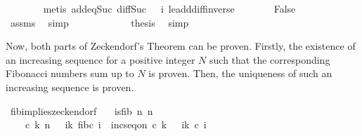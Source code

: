 \begin{isabellebody}
\ \ \ \ \ \ \isamarkupfalse%
\ {\isacharparenleft}{\kern0pt}metis\ add{\isacharunderscore}{\kern0pt}{}{\isacharunderscore}{\kern0pt}eq{\isacharunderscore}{\kern0pt}Suc\ diff{\isacharunderscore}{\kern0pt}Suc{\isacharunderscore}{\kern0pt}{}\ {\isacartoucheopen}{}\ {\isasymle}\ i{\isacartoucheclose}\ le{\isacharunderscore}{\kern0pt}add{\isacharunderscore}{\kern0pt}diff{\isacharunderscore}{\kern0pt}inverse{\isacharparenright}{\kern0pt}\isanewline
\ \ \ \ \isamarkupfalse%
\ \isamarkupfalse%
\ False\isanewline
\ \ \ \ \ \ \isamarkupfalse%
\ assms\ \isamarkupfalse%
\ simp\isanewline
\ \ \ \ \isamarkupfalse%
\isanewline
\ \ \ \ \isamarkupfalse%
\ \isamarkupfalse%
\ {\isacharquery}{\kern0pt}thesis\ \isamarkupfalse%
\ simp\isanewline
\ \ \isamarkupfalse%
%
\endisatagproof
{\isafoldproof}%
%
\isadelimproof
%
\endisadelimproof
%
\isadelimdocument
%
\endisadelimdocument
%
\isatagdocument
%
\isamarkuptrue%
%
\endisatagdocument
{\isafolddocument}%
%
\isadelimdocument
%
\endisadelimdocument
%
\begin{isamarkuptext}%
Now, both parts of Zeckendorf's Theorem can be proven. Firstly, the existence of an increasing 
  sequence for a positive integer $N$ such that the corresponding Fibonacci numbers sum up to $N$ 
  is proven. Then, the uniqueness of such an increasing sequence is proven.%
\end{isamarkuptext}\isamarkuptrue%
\isamarkupfalse%
\ fib{\isacharunderscore}{\kern0pt}implies{\isacharunderscore}{\kern0pt}zeckendorf{\isacharcolon}{\kern0pt}\isanewline
\ \ \ {\isachardoublequoteopen}is{\isacharunderscore}{\kern0pt}fib\ n{\isachardoublequoteclose}\ {\isachardoublequoteopen}n\ {\isachargreater}{\kern0pt}\ {}{\isachardoublequoteclose}\isanewline
\ \ \ {\isachardoublequoteopen}{\isasymexists}\ c\ k{\isachardot}{\kern0pt}\ n\ {\isacharequal}{\kern0pt}\ {\isacharparenleft}{\kern0pt}{\isasymSum}\ i{\isacharequal}{\kern0pt}{}{\isachardot}{\kern0pt}{\isachardot}{\kern0pt}k{\isachardot}{\kern0pt}\ fib{\isacharparenleft}{\kern0pt}c\ i{\isacharparenright}{\kern0pt}{\isacharparenright}{\kern0pt}\ {\isasymand}\ inc{\isacharunderscore}{\kern0pt}seq{\isacharunderscore}{\kern0pt}on\ c\ {\isacharbraceleft}{\kern0pt}{}{\isachardot}{\kern0pt}{\isachardot}{\kern0pt}k{\isacharminus}{\kern0pt}{}{\isacharbraceright}{\kern0pt}\ {\isasymand}\ {\isacharparenleft}{\kern0pt}{\isasymforall}\ i{\isasymin}{\isacharbraceleft}{\kern0pt}{}{\isachardot}{\kern0pt}{\isachardot}{\kern0pt}k{\isacharbraceright}{\kern0pt}{\isachardot}{\kern0pt}\ c\ i\ {\isasymge}\ {}{\isacharparenright}{\kern0pt}{\isachardoublequoteclose}\ \isanewline

\end{isabellebody}
